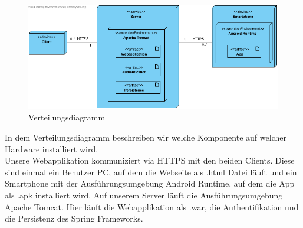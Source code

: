 \begin{figure}[ht]
	\centering
	\includegraphics[keepaspectratio,width=15cm]{verteilungsdiagramm/verteilungsdiagramm}
	\caption{Verteilungsdiagramm}
	\label{fig:verteilungsdiagramm}
\end{figure}
In dem Verteilungsdiagramm beschreiben wir welche Komponente auf welcher Hardware installiert wird.
\\
Unsere Webapplikation kommuniziert via HTTPS mit den beiden Clients.
Diese sind einmal ein Benutzer PC, auf dem die Webseite als .html Datei läuft und ein Smartphone mit der Ausführungsumgebung Android Runtime, auf dem die App als .apk installiert wird.
Auf unserem Server läuft die Ausführungsumgebung Apache Tomcat.
Hier läuft die Webapplikation als .war, die Authentifikation und die Persistenz des Spring Frameworks.
